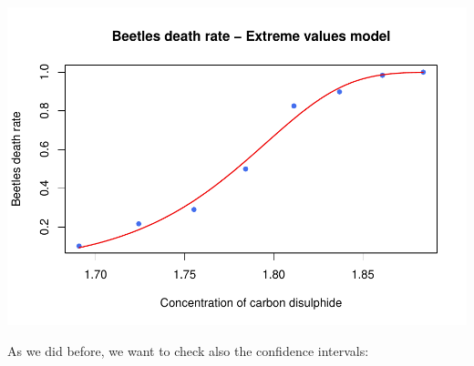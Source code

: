\documentclass[]{article}
\begin{document}
\includegraphics{FinalProject-SDSII_files/figure-latex/unnamed-chunk-28-1.pdf}

As we did before, we want to check also the confidence intervals:
\end{document}
